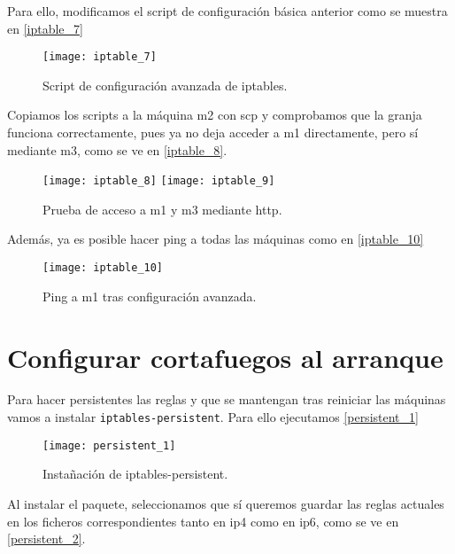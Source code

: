 Para ello, modificamos el script de configuración básica anterior como se muestra en \eqref{iptable_7}

\begin{figure}[h!]
\begin{center}
\caption{Script de configuración avanzada de iptables.}
\label{iptable_7}
\texttt{[image: iptable\_7]}
\end{center}
\end{figure}

Copiamos los scripts a la máquina m2 con scp y comprobamos que la granja funciona correctamente, pues ya no deja acceder a m1 directamente, pero sí mediante m3, como se ve en \eqref{iptable_8}.

\begin{figure}[h!]
\begin{center}
\caption{Prueba de acceso a m1 y m3 mediante http.}
\label{iptable_8}
\texttt{[image: iptable\_8]}
\texttt{[image: iptable\_9]}
\end{center}
\end{figure}

Además, ya es posible hacer ping a todas las máquinas como en \eqref{iptable_10}

\begin{figure}[h!]
\begin{center}
\caption{Ping a m1 tras configuración avanzada.}
\label{iptable_10}
\texttt{[image: iptable\_10]}
\end{center}
\end{figure}



\chapter{Configurar cortafuegos al arranque}

Para hacer persistentes las reglas y que se mantengan tras reiniciar las máquinas vamos a instalar \verb|iptables-persistent|. Para ello ejecutamos \eqref{persistent_1}

\begin{figure}[h!]
\begin{center}
\caption{Instañación de iptables-persistent.}
\label{persistent_1}
\texttt{[image: persistent\_1]}
\end{center}
\end{figure}

Al instalar el paquete, seleccionamos que sí queremos guardar las reglas actuales en los ficheros correspondientes tanto en ip4 como en ip6, como se ve en \eqref{persistent_2}.

